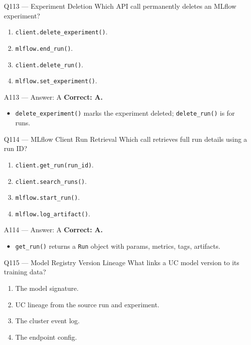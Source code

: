 \documentclass[aspectratio=169,9pt]{beamer}
\begin{document}
	\begin{frame}{Q113 --- Experiment Deletion}
		Which API call permanently deletes an MLflow experiment?
		\begin{enumerate}[label=\Alph*.]
			\item \texttt{client.delete\_experiment()}.
			\item \texttt{mlflow.end\_run()}.
			\item \texttt{client.delete\_run()}.
			\item \texttt{mlflow.set\_experiment()}.
		\end{enumerate}
	\end{frame}
	
	\begin{frame}{A113 --- Answer: A}
		\textbf{Correct: A.}
		\begin{itemize}
			\item \texttt{delete\_experiment()} marks the experiment deleted; \texttt{delete\_run()} is for runs.
		\end{itemize}
	\end{frame}
	
	\begin{frame}{Q114 --- MLflow Client Run Retrieval}
		Which call retrieves full run details using a run ID?
		\begin{enumerate}[label=\Alph*.]
			\item \texttt{client.get\_run(run\_id)}.
			\item \texttt{client.search\_runs()}.
			\item \texttt{mlflow.start\_run()}.
			\item \texttt{mlflow.log\_artifact()}.
		\end{enumerate}
	\end{frame}
	
	\begin{frame}{A114 --- Answer: A}
		\textbf{Correct: A.}
		\begin{itemize}
			\item \texttt{get\_run()} returns a \texttt{Run} object with params, metrics, tags, artifacts.
		\end{itemize}
	\end{frame}
	
	\begin{frame}{Q115 --- Model Registry Version Lineage}
		What links a UC model version to its training data?
		\begin{enumerate}[label=\Alph*.]
			\item The model signature.
			\item UC lineage from the source run and experiment.
			\item The cluster event log.
			\item The endpoint config.
		\end{enumerate}
	\end{frame}
	
\end{document}
